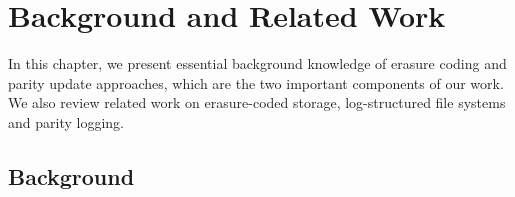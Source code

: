 \chapter{Background and Related Work}
\label{chap:background}

In this chapter, we present essential background knowledge of erasure coding and
parity update approaches, which are the two important components of our work.
We also review related work on erasure-coded storage, log-structured file
systems and parity logging.

\section{Background}



%




